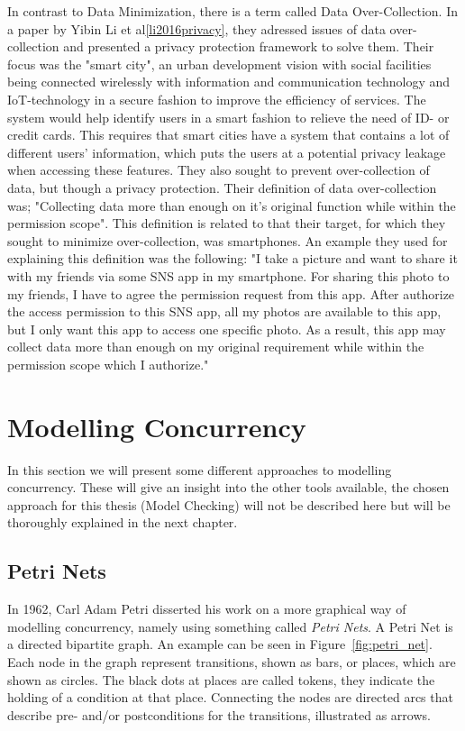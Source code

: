 In contrast to Data Minimization, there is a term called Data Over-Collection. In a paper by Yibin Li et al\ref{li2016privacy}, they adressed issues of data over-collection and presented a privacy protection framework to solve them. Their focus was the "smart city", an urban development vision with social facilities being connected wirelessly with information and communication technology and IoT-technology in a secure fashion to improve the efficiency of services. The system would help identify users in a smart fashion to relieve the need of ID- or credit cards. This requires that smart cities have a system that contains a lot of different users' information, which puts the users at a potential privacy leakage when accessing these features. They also sought to prevent over-collection of data, but though a privacy protection. Their definition of data over-collection was; "Collecting data more than enough on it's original function while within the permission scope". This definition is related to that their target, for which they sought to minimize over-collection, was smartphones. An example they used for explaining this definition was the following: "I take a picture and want to share it with my friends via some SNS app in my smartphone. For sharing this photo to my friends, I have to agree the permission request from this app. After authorize the access permission to this SNS app, all my photos are available to this app, but I only want this app to access one specific photo. As a result, this app may collect data more than enough on my original requirement while within the permission scope which I authorize." 


\section{Modelling Concurrency}

In this section we will present some different approaches to modelling concurrency. These will give an insight into the other tools available, the chosen approach for this thesis (Model Checking) will not be described here but will be thoroughly explained in the next chapter.

\subsection{Petri Nets}

In 1962, Carl Adam Petri disserted his work on a more graphical way of modelling concurrency, namely using something called \textit{Petri Nets}. A Petri Net is a directed bipartite graph. An example can be seen in Figure~\ref{fig:petri_net}. Each node in the graph represent transitions, shown as bars, or places, which are shown as circles. The black dots at places are called tokens, they indicate the holding of a condition at that place. Connecting the nodes are directed arcs that describe pre- and/or postconditions for the transitions, illustrated as arrows. 

